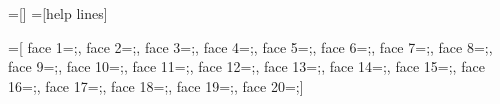 \def\tikz@lib@fold@path{\draw[every fold](0,0) -- (\tikz@lib@fold@length,0pt);}
\def\tikz@lib@fold@cut@path{\draw[every cut](0,0) -- (\tikz@lib@fold@length,0pt);}
\def\tikz@lib@fold@ear@path{
  \draw[every fold](0,0) -- (\tikz@lib@fold@length,0pt);
  \draw[every cut] (0,0) -- (.5\tikz@lib@fold@length,.2\tikz@lib@fold@length) --(\tikz@lib@fold@length,0pt);}

=[]
=[help lines]


\let\tikz@lib@fold@face@A=\pgfutil@empty
\let\tikz@lib@fold@face@B=\pgfutil@empty
\let\tikz@lib@fold@face@C=\pgfutil@empty
\let\tikz@lib@fold@face@D=\pgfutil@empty
\let\tikz@lib@fold@face@E=\pgfutil@empty
\let\tikz@lib@fold@face@F=\pgfutil@empty
\let\tikz@lib@fold@face@G=\pgfutil@empty
\let\tikz@lib@fold@face@H=\pgfutil@empty
\let\tikz@lib@fold@face@I=\pgfutil@empty
\let\tikz@lib@fold@face@J=\pgfutil@empty
\let\tikz@lib@fold@face@K=\pgfutil@empty
\let\tikz@lib@fold@face@L=\pgfutil@empty
\let\tikz@lib@fold@face@M=\pgfutil@empty
\let\tikz@lib@fold@face@N=\pgfutil@empty
\let\tikz@lib@fold@face@O=\pgfutil@empty
\let\tikz@lib@fold@face@P=\pgfutil@empty
\let\tikz@lib@fold@face@Q=\pgfutil@empty
\let\tikz@lib@fold@face@R=\pgfutil@empty
\let\tikz@lib@fold@face@S=\pgfutil@empty
\let\tikz@lib@fold@face@T=\pgfutil@empty

=[%
	face  1={;},
	face  2={;},
	face  3={;},
	face  4={;},
	face  5={;},
	face  6={;},
	face  7={;},
	face  8={;},
	face  9={;},
	face 10={;},
	face 11={;},
	face 12={;},
	face 13={;},
	face 14={;},
	face 15={;},
	face 16={;},
	face 17={;},
	face 18={;},
	face 19={;},
	face 20={;}]


